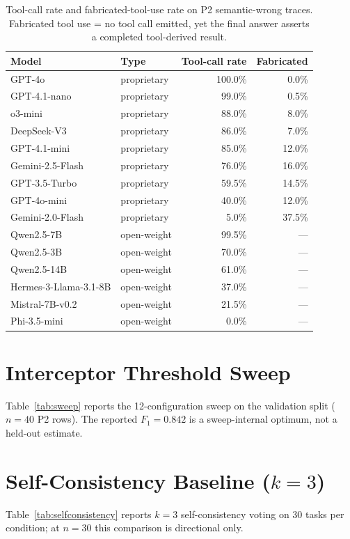 \documentclass[11pt]{article}
\begin{document}
\begin{table}[h]
\centering
\caption{Tool-call rate and fabricated-tool-use rate on P2 semantic-wrong
traces. Fabricated tool use = no tool call emitted, yet the final answer
asserts a completed tool-derived result.}
\label{tab:toolcallS}
\begin{tabular}{llrr}
\toprule
Model & Type & Tool-call rate & Fabricated \\
\midrule
GPT-4o            & proprietary & 100.0\% & 0.0\% \\
GPT-4.1-nano      & proprietary & 99.0\%  & 0.5\% \\
o3-mini           & proprietary & 88.0\%  & 8.0\% \\
DeepSeek-V3       & proprietary & 86.0\%  & 7.0\% \\
GPT-4.1-mini      & proprietary & 85.0\%  & 12.0\% \\
Gemini-2.5-Flash  & proprietary & 76.0\%  & 16.0\% \\
GPT-3.5-Turbo     & proprietary & 59.5\%  & 14.5\% \\
GPT-4o-mini       & proprietary & 40.0\%  & 12.0\% \\
Gemini-2.0-Flash  & proprietary & 5.0\%   & 37.5\% \\
\midrule
Qwen2.5-7B        & open-weight & 99.5\%  & --- \\
Qwen2.5-3B        & open-weight & 70.0\%  & --- \\
Qwen2.5-14B       & open-weight & 61.0\%  & --- \\
Hermes-3-Llama-3.1-8B & open-weight & 37.0\% & --- \\
Mistral-7B-v0.2   & open-weight & 21.5\%  & --- \\
Phi-3.5-mini      & open-weight & 0.0\%   & --- \\
\bottomrule
\end{tabular}
\end{table}

\section{Interceptor Threshold Sweep}
Table~\ref{tab:sweep} reports the 12-configuration sweep on the validation
split ($n{=}40$ P2 rows). The reported $F_1{=}0.842$ is a sweep-internal
optimum, not a held-out estimate.


\section{Self-Consistency Baseline ($k{=}3$)}
Table~\ref{tab:selfconsistency} reports $k{=}3$ self-consistency voting on 30 tasks per
condition; at $n{=}30$ this comparison is directional only.

\end{document}
